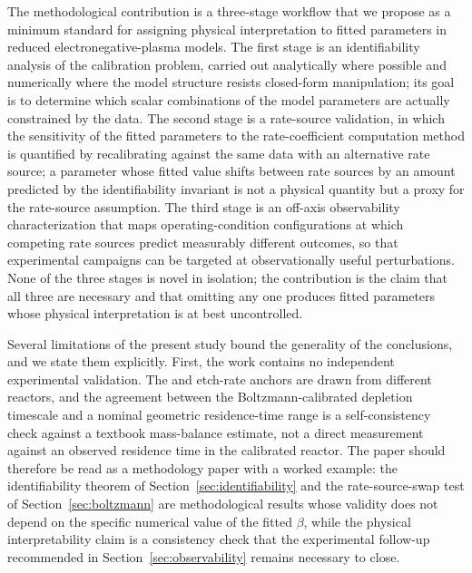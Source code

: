 The methodological contribution is a three-stage workflow that we
propose as a minimum standard for assigning physical
interpretation to fitted parameters in reduced
electronegative-plasma models. The first stage is an identifiability
analysis of the calibration problem, carried out analytically where
possible and numerically where the model structure resists
closed-form manipulation; its goal is to determine which scalar
combinations of the model parameters are actually constrained by
the data. The second stage is a rate-source validation, in which
the sensitivity of the fitted parameters to the rate-coefficient
computation method is quantified by recalibrating against the same
data with an alternative rate source; a parameter whose fitted
value shifts between rate sources by an amount predicted by the
identifiability invariant is not a physical quantity but a proxy
for the rate-source assumption. The third stage is an off-axis
observability characterization that maps operating-condition
configurations at which competing rate sources predict measurably
different outcomes, so that experimental campaigns can be targeted
at observationally useful perturbations. None of the three stages
is novel in isolation; the contribution is the claim that all
three are necessary and that omitting any one produces fitted
parameters whose physical interpretation is at best uncontrolled.

Several limitations of the present study bound the generality of
the conclusions, and we state them explicitly. First, the work
contains no independent experimental validation. The
\citet{mansano1999} and \citet{panduranga2019} etch-rate anchors
are drawn from different reactors, and the agreement between the
Boltzmann-calibrated depletion timescale and a nominal geometric
residence-time range is a self-consistency check against a
textbook mass-balance estimate, not a direct measurement against
an observed residence time in the calibrated reactor. The paper
should therefore be read as a methodology paper with a worked
example: the identifiability theorem of
Section~\ref{sec:identifiability} and the rate-source-swap test of
Section~\ref{sec:boltzmann} are methodological results whose
validity does not depend on the specific numerical value of the
fitted $\beta$, while the physical interpretability claim is a
consistency check that the experimental follow-up recommended in
Section~\ref{sec:observability} remains necessary to close.

